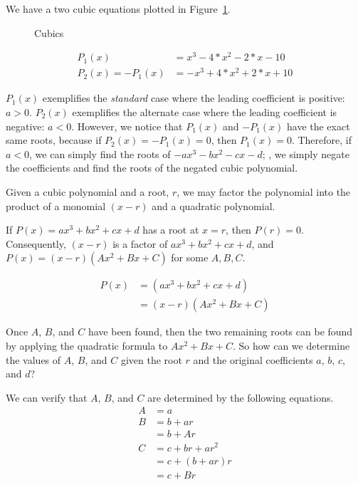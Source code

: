We have a two cubic equations plotted in Figure~\ref{fig.cubic}.

\begin{figure}
  \centering

  \caption{Cubics}
  \label{fig.cubic}
\end{figure}

\begin{align*}
  P_1(x) &= x^3 - 4*x^2 - 2*x - 10\\
  P_2(x) = -P_1(x) &= -x^3 + 4*x^2 + 2*x + 10
\end{align*}

$P_1(x)$ exemplifies the \emph{standard} case where the leading coefficient is positive: $a>0$.
$P_2(x)$ exemplifies the alternate case where the leading coefficient is negative: $a<0$.
However, we notice that $P_1(x)$ and $-P_1(x)$ have the exact same roots, because if $P_2(x) = -P_1(x) = 0$,
then $P_1(x) = 0$.  Therefore, if $a<0$, we can simply find the roots of $-a x^3 -b x^2 - c x - d$;
\ie, we simply negate the coefficients and find the roots of the negated cubic polynomial.




Given a cubic polynomial and a root, $r$, we may factor the polynomial into
the product of a monomial $(x-r)$ and a quadratic polynomial.

If $P(x) = a x^3 + b x^2 + c x + d$ has a root at $x=r$, then $P(r)=0$.
Consequently, $(x-r)$ is a factor of $a x^3 + b x^2 + c x + d$, and
$P(x) = (x-r)(A x^2 + B x + C)$ for some $A, B, C$.  

\begin{align}
  P(x) &=  (a x^3 + b x^2 + c x + d)\nonumber\\
  &= (x-r) (A x^2 + B x + C)\label{eq.factor.ABC}
\end{align}

Once $A$, $B$,
and $C$ have been found, then the two remaining roots can be found by
applying the quadratic formula to $A x^2 + B x + C$.  So how can we
determine the values of $A$, $B$, and $C$ given the root $r$ and the
original coefficients $a$, $b$, $c$, and $d$?


We can verify that $A$, $B$, and $C$ are determined by the following equations.
\begin{align}
 A &= a\label{eq.6.A}\\
  B &= b + a r\nonumber\\
   &= b + A r\label{eq.6.B}\\
  C &= c + b r + a r^2\nonumber\\
  &= c + (b + a r) r\nonumber\\
  &= c + B r\label{eq.6.C}
\end{align}



